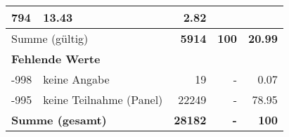 \begin{longtable}{lXrrr}
       \num{794} &
       \num[round-mode=places,round-precision=2]{13.43} &
         \num[round-mode=places,round-precision=2]{2.82} \\
     \midrule
     \multicolumn{2}{l}{Summe (gültig)} &
       \textbf{\num{5914}} &
     \textbf{100} &
       \textbf{\num[round-mode=places,round-precision=2]{20.99}} \\
     \multicolumn{5}{l}{\textbf{Fehlende Werte}}\\
       -998 &
       keine Angabe &
         \num{19} &
        - &
         \num[round-mode=places,round-precision=2]{0.07} \\
       -995 &
       keine Teilnahme (Panel) &
         \num{22249} &
        - &
         \num[round-mode=places,round-precision=2]{78.95} \\
     \midrule
     \multicolumn{2}{l}{\textbf{Summe (gesamt)}} &
          \textbf{\num{28182}} &
        \textbf{-} &
        \textbf{100} \\
     \bottomrule
     \end{longtable}
     
